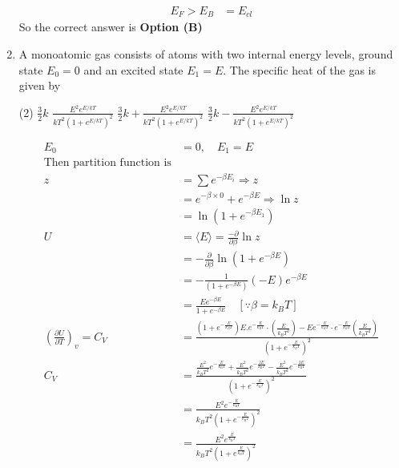 \begin{enumerate}
\begin{answer}
\begin{align*}
E_{F}>E_{B}&=E_{c l}
\end{align*}
So the correct answer is \textbf{Option (B)}
\end{answer}
	\item A monoatomic gas consists of atoms with two internal energy levels, ground state $E_{0}=0$ and an excited state $E_{1}=E$. The specific heat of the gas is given by
{	}
\begin{tasks}(2)
\task[\textbf{A.}] $\frac{3}{2} k$
\task[\textbf{B.}] $\frac{E^{2} e^{E / k T}}{k T^{2}\left(1+e^{E / k T}\right)^{2}}$
\task[\textbf{C.}] $\frac{3}{2} k+\frac{E^{2} e^{E / k T}}{k T^{2}\left(1+e^{E / k T}\right)^{2}}$
\task[\textbf{D.}] $\frac{3}{2} k-\frac{E^{2} e^{E / k T}}{k T^{2}\left(1+e^{E / k T}\right)^{2}}$
\end{tasks}
\begin{answer}
\begin{align*}
E_{0}&=0, \quad E_{1}=E\\
\text{Then partition function is}\\
z&=\sum e^{-\beta E_{i}} \Rightarrow z\\&=e^{-\beta \times 0}+e^{-\beta E} \Rightarrow \ln z\\&=\ln \left(1+e^{-\beta E_{1}}\right)\\
U&=\langle E\rangle=\frac{-\partial}{\partial \beta} \ln z\\&=-\frac{\partial}{\partial \beta} \ln \left(1+e^{-\beta E}\right)\\&=-\frac{1}{\left(1+e^{-\beta E}\right)}(-E) e^{-\beta E}\\&=\frac{E e^{-\beta E}}{1+e^{-\beta E}} \quad\left[\because \beta=k_{B} T\right]\\
\left(\frac{\partial U}{\partial T}\right)_{v}=C_{V}&=\frac{\left(1+e^{-\frac{E}{k_{B} T}}\right) E . e^{-\frac{E}{k_{B} T}} \cdot\left(\frac{E}{k_{B} T^{2}}\right)-E e^{-\frac{E}{k_{B} T}} \cdot e^{-\frac{E}{k_{B} T}}\left(\frac{E}{k_{B} T^{2}}\right)}{\left(1+e^{-\frac{E}{k_{B} T}}\right)^{2}}\\
C_{V}&=\frac{\frac{E^{2}}{k_{B} T^{2}} e^{-\frac{E}{k_{\mathrm{B}} T}}+\frac{E^{2}}{k_{B} T^{2}} e^{-\frac{2 E}{k_{\mathrm{B}} T}}-\frac{E^{2}}{k_{B} T^{2}} e^{-\frac{2 E}{k_{\mathrm{B}} T}}}{\left(1+e^{-\frac{E}{k_{\mathrm{B}} T}}\right)^{2}}\\&=\frac{E^{2} e^{-\frac{E}{k_{\mathrm{B}} T}}}{k_{B} T^{2}\left(1+e^{-\frac{E}{k_{\mathrm{B}} T}}\right)^{2}}\\&=\frac{E^{2} e^{\frac{E}{k_{\mathrm{B}} T}}}{k_{B} T^{2}\left(1+e^{\frac{E}{k_{\mathrm{B}} T}}\right)^{2}}\\

\end{align*}
\end{answer}
\end{enumerate}
